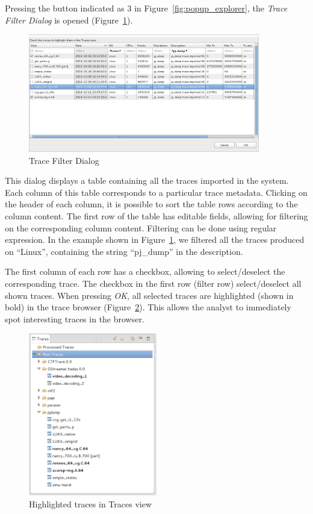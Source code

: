 \documentclass[twoside]{article}
\begin{document}
\begin{sloppypar}
Pressing the button indicated as \num{3} in Figure~\ref{fig:popup_explorer}, the \emph{Trace Filter Dialog} is opened (Figure~\ref{fig:trace_filter_dialog}).

\begin{figure}[h!]
  \centering
    \includegraphics[width=0.9\textwidth]{images/trace_table_filter.png}
  \caption{Trace Filter Dialog}
  \label{fig:trace_filter_dialog}
\end{figure}

This dialog displays a table containing all the traces imported in the system. Each column of this table corresponds to a particular trace metadata. Clicking on the header of each column, it is possible to sort the table rows according to the column content. The first row of the table has editable fields, allowing for filtering on the corresponding column content. Filtering can be done using regular expression. In the example shown in Figure~\ref{fig:trace_filter_dialog}, we filtered all the traces produced on ``Linux'', containing the string ``pj\_dump'' in the description.

The first column of each row has a checkbox, allowing to select/deselect the corresponding trace. The checkbox in the first row (filter row) select/deselect all shown traces.
When pressing \emph{OK}, all selected traces are highlighted (shown in bold) in the trace browser (Figure~\ref{fig:highlight}). This allows the analyst to immediately spot interesting traces in the browser.

\begin{figure}[h!]
  \centering
    \includegraphics[width=0.5\textwidth]{images/trace_browser_highlight.png}
  \caption{Highlighted traces in Traces view}
  \label{fig:highlight}
\end{figure}


\end{sloppypar}
\end{document}

